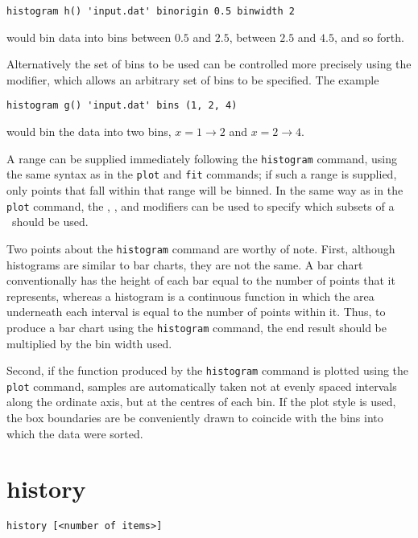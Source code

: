 \begin{verbatim}
histogram h() 'input.dat' binorigin 0.5 binwidth 2
\end{verbatim}

\noindent would bin data into bins between $0.5$ and $2.5$, between $2.5$ and
$4.5$, and so forth.

Alternatively the set of bins to be used can be controlled more precisely using
the  modifier, which allows an arbitrary set of bins to be
specified. The example

\begin{verbatim}
histogram g() 'input.dat' bins (1, 2, 4)
\end{verbatim}

\noindent would bin the data into two bins, $x=1\to 2$ and $x=2\to 4$.

A range can be supplied immediately following the {\tt histogram} command,
using the same syntax as in the {\tt plot} and {\tt fit} commands; if such a
range is supplied, only points that fall within that range will be binned.  In
the same way as in the {\tt plot} command, the ,
,  and  modifiers can be used to
specify which subsets of a \datafile\ should be used.

Two points about the {\tt histogram} command are worthy of note. First,
although histograms are similar to bar charts, they are not the same.  A bar
chart conventionally has the height of each bar equal to the number of points
that it represents, whereas a histogram is a continuous function in which the
area underneath each interval is equal to the number of points within it.
Thus, to produce a bar chart using the {\tt histogram} command, the end result
should be multiplied by the bin width used.

Second, if the function produced by the {\tt histogram} command is plotted
using the {\tt plot} command, samples are automatically taken not at evenly
spaced intervals along the ordinate axis, but at the centres of each bin. If
the  plot style is used, the box boundaries are be conveniently
drawn to coincide with the bins into which the data were sorted.


\section{history}

\begin{verbatim}
history [<number of items>]
\end{verbatim}

